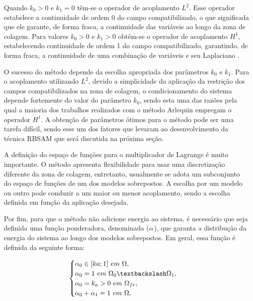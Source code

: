 Quando $k_{0} > 0$ e $k_{1} = 0 $ têm-se o operador de acoplamento $L^{2}$. Esse operador estabelece a continuidade de ordem 0 do campo compatibilizado, o que significada que ele garante, de forma fraca, a continuidade das variáveis ao longo da zona de colagem. Para valores $k_{0} > 0$ e $k_{1} > 0 $ obtêm-se o operador de acoplamento $H^{1}$, estabelecendo continuidade de ordem 1 do campo compatibilizado, garantindo, de forma fraca, a continuidade de uma combinação de variáveis e seu Laplaciano \cite{GuidaultAndBelytschko2007}.

O sucesso do método depende da escolha apropriada dos parâmetros $k_{0}$ e $k_{1}$. Para o acoplamento utilizando $L^{2}$, devido a simplicidade da aplicação da restrição dos campos compatibilizados na zona de colagem, o condicionamento do sistema depende fortemente do valor do parâmetro $k_{0}$, sendo esta uma das razões pela qual a maioria dos trabalhos realizados com o método Arlequin empregam o operador $H^{1}$. A obtenção de parâmetros ótimos para o método pode ser uma tarefa difícil, sendo esse um dos fatores que levaram  ao desenvolvimento da técnica RBSAM que será discutida na próxima seção.

A definição do espaço de funções para o multiplicador de Lagrange é muito importante. O método apresenta flexibilidade para usar uma discretização diferente da zona de colagem, entretanto, usualmente se adota um subconjunto do espaço de funções de um dos modelos sobrepostos. A escolha por um modelo ou outro pode conduzir a um maior ou menor acoplamento, sendo a escolha definida em função da aplicação desejada. 

Por fim, para que o método não adicione energia ao sistema, é necessário que seja definida uma função ponderadora, denominada ($\alpha$), que garanta a distribução da energia do sistema ao longo dos modelos sobrepostos. Em geral, essa função é definida da seguinte forma:

\begin{align}
	\begin{cases} \arlequinWFGlobal \in [ka;1] \ em \ \domain, \\ 
	\arlequinWFGlobal = 1 \ em \ \globalModel \textbackslash \localModel,  \\
	\arlequinWFGlobal  = k_a > 0 \ em \ \freeZone, \\
	\arlequinWFGlobal + \arlequinWFLocal = 1 \ em \ \domain,
	\end{cases} \label{eq:funcPondeArleq}
\end{align}

